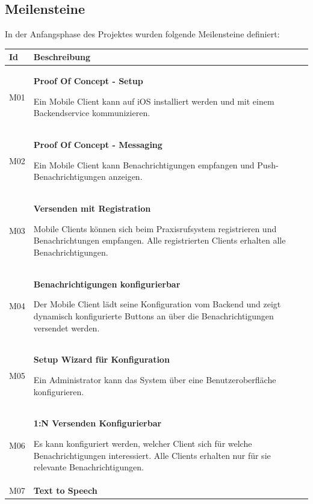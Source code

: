 \clearpage
\subsection{Meilensteine}

In der Anfangsphase des Projektes wurden folgende Meilensteine definiert:

\begin{table}[h]
    \centering
    \begin{tabular}{|l|p{15cm}|}
        \hline
        \textbf{Id} & \textbf{Beschreibung}                                                                                                                                                                                         \\
        \hline
        M01         & \textbf{Proof Of Concept - Setup}

        Ein Mobile Client kann auf iOS installiert werden und mit einem Backendservice kommunizieren. \\
        \hline
        M02         & \textbf{Proof Of Concept - Messaging}

        Ein Mobile Client kann Benachrichtigungen empfangen und Push-Benachrichtigungen anzeigen. \\
        \hline
        M03         & \textbf{Versenden mit Registration}

        Mobile Clients können sich beim Praxisrufsystem registrieren und Benachrichtungen empfangen. Alle registrierten Clients erhalten alle Benachrichtigungen. \\
        \hline
        M04         & \textbf{Benachrichtigungen konfigurierbar}

        Der Mobile Client lädt seine Konfiguration vom Backend und zeigt dynamisch konfigurierte Buttons an über die Benachrichtigungen versendet werden.\\
        \hline
        M05         & \textbf{Setup Wizard für Konfiguration}

        Ein Administrator kann das System über eine Benutzeroberfläche konfigurieren. \\
        \hline
        M06         & \textbf{1:N Versenden Konfigurierbar}

        Es kann konfiguriert werden, welcher Client sich für welche Benachrichtigungen interessiert. Alle Clients erhalten nur für sie relevante Benachrichtigungen.  \\
        \hline
        M07         & \textbf{Text to Speech}


\end{tabular}
\end{table}
